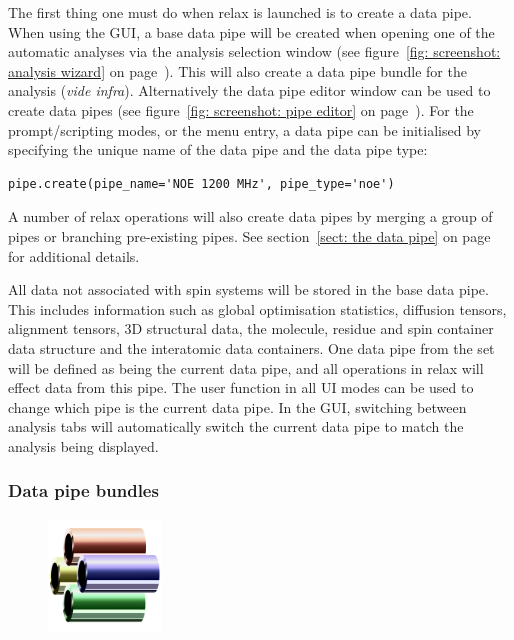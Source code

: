 The first thing one must do when relax is launched is to create a data pipe.  When using the GUI, a base data pipe will be created when opening one of the automatic analyses via the analysis selection window (see figure~\ref{fig: screenshot: analysis wizard} on page~\pageref{fig: screenshot: analysis wizard}).  This will also create a data pipe bundle for the analysis (\textit{vide infra}).  Alternatively the data pipe editor window can be used to create data pipes (see figure~\ref{fig: screenshot: pipe editor} on page~\pageref{fig: screenshot: pipe editor}).  For the prompt/scripting modes, or the  menu entry, a data pipe can be initialised by specifying the unique name of the data pipe and the data pipe type:

\begin{lstlisting}
pipe.create(pipe_name='NOE 1200 MHz', pipe_type='noe')
\end{lstlisting}

A number of relax operations will also create data pipes by merging a group of pipes or branching pre-existing pipes.  See section~\ref{sect: the data pipe} on page~\pageref{sect: the data pipe} for additional details.

All data not associated with spin systems will be stored in the base data pipe.  This includes information such as global optimisation statistics, diffusion tensors, alignment tensors, 3D structural data, the molecule, residue and spin container data structure and the interatomic data containers.  One data pipe from the set will be defined as being the current data pipe, and all operations in relax will effect data from this pipe.  The  user function in all UI modes can be used to change which pipe is the current data pipe.  In the GUI, switching between analysis tabs will automatically switch the current data pipe to match the analysis being displayed.


\subsubsection{Data pipe bundles} \label{sect: data pipe bundles}

\begin{figure}[h]
\includegraphics[width=3cm, bb=0 0 1701 1701]{graphics/misc/pipe_bundle_600x600}
\end{figure}

